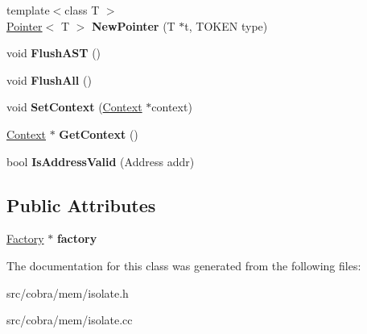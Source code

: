 \begin{DoxyCompactItemize}
\item 
\hypertarget{class_cobra_1_1internal_1_1_isolate_ae38756c7f9f23c6167556ce2894a30f6}{{\footnotesize template$<$class T $>$ }\\\hyperlink{class_cobra_1_1internal_1_1_pointer}{Pointer}$<$ T $>$ {\bfseries New\+Pointer} (T $\ast$t, T\+O\+K\+E\+N type)}\label{class_cobra_1_1internal_1_1_isolate_ae38756c7f9f23c6167556ce2894a30f6}

\item 
\hypertarget{class_cobra_1_1internal_1_1_isolate_a87b1ff838a1ae533c775a601ab7dafb2}{void {\bfseries Flush\+A\+S\+T} ()}\label{class_cobra_1_1internal_1_1_isolate_a87b1ff838a1ae533c775a601ab7dafb2}

\item 
\hypertarget{class_cobra_1_1internal_1_1_isolate_a97a78a3e571d29e9be6ea06c97cb7f33}{void {\bfseries Flush\+All} ()}\label{class_cobra_1_1internal_1_1_isolate_a97a78a3e571d29e9be6ea06c97cb7f33}

\item 
\hypertarget{class_cobra_1_1internal_1_1_isolate_a58d4918a76222420143b75c59e1e9f21}{void {\bfseries Set\+Context} (\hyperlink{class_cobra_1_1internal_1_1_context}{Context} $\ast$context)}\label{class_cobra_1_1internal_1_1_isolate_a58d4918a76222420143b75c59e1e9f21}

\item 
\hypertarget{class_cobra_1_1internal_1_1_isolate_a63d249ac4df7862ca1ac84c4f8df4ea3}{\hyperlink{class_cobra_1_1internal_1_1_context}{Context} $\ast$ {\bfseries Get\+Context} ()}\label{class_cobra_1_1internal_1_1_isolate_a63d249ac4df7862ca1ac84c4f8df4ea3}

\item 
\hypertarget{class_cobra_1_1internal_1_1_isolate_adf2f01b66107a1b9cfb0e2381732d965}{bool {\bfseries Is\+Address\+Valid} (Address addr)}\label{class_cobra_1_1internal_1_1_isolate_adf2f01b66107a1b9cfb0e2381732d965}

\end{DoxyCompactItemize}
\subsection*{Public Attributes}
\begin{DoxyCompactItemize}
\item 
\hypertarget{class_cobra_1_1internal_1_1_isolate_a29719d0436322bc0e85817c9648769b0}{\hyperlink{class_cobra_1_1internal_1_1_factory}{Factory} $\ast$ {\bfseries factory}}\label{class_cobra_1_1internal_1_1_isolate_a29719d0436322bc0e85817c9648769b0}

\end{DoxyCompactItemize}


The documentation for this class was generated from the following files\+:\begin{DoxyCompactItemize}
\item 
src/cobra/mem/isolate.\+h\item 
src/cobra/mem/isolate.\+cc\end{DoxyCompactItemize}
